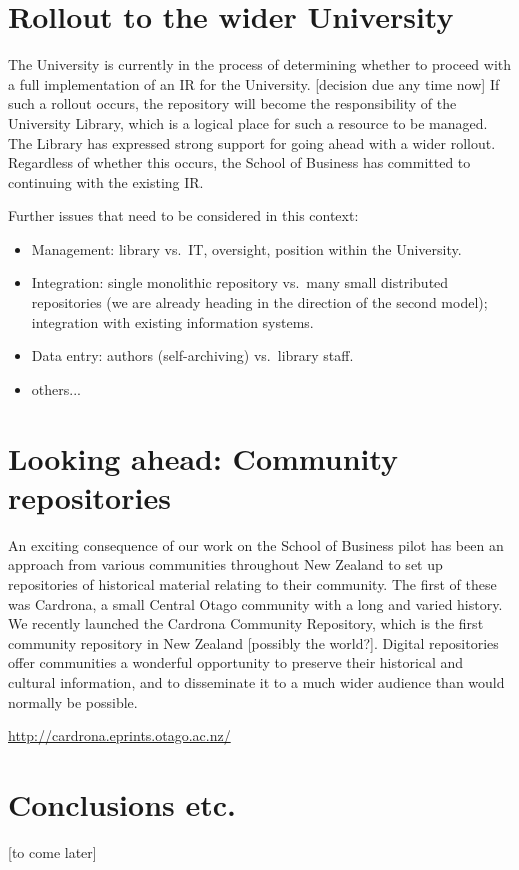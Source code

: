 \documentclass[12pt,pdftex,a4paper,titlepage]{article}
\begin{document}
\section{Rollout to the wider University}

The University is currently in the process of determining whether to proceed with a full implementation of an IR for the University. [decision due any time now] If such a rollout occurs, the repository will become the responsibility of the University Library, which is a logical place for such a resource to be managed. The Library has expressed strong support for going ahead with a wider rollout. Regardless of whether this occurs, the School of Business has committed to continuing with the existing IR.

Further issues that need to be considered in this context:


\begin{itemize}

	\item Management: library vs.\ IT, oversight, position within the University.

	\item Integration: single monolithic repository vs.\ many small distributed repositories (we are already heading in the direction of the second model); integration with existing information systems.

	\item Data entry: authors (self-archiving) vs.\ library staff.

	\item others...

\end{itemize}


\section{Looking ahead: Community repositories}

An exciting consequence of our work on the School of Business pilot has been an approach from various communities throughout New Zealand to set up repositories of historical material relating to their community. The first of these was Cardrona, a small Central Otago community with a long and varied history. We recently launched the Cardrona Community Repository, which is the first community repository in New Zealand [possibly the world?]. Digital repositories offer communities a wonderful opportunity to preserve their historical and cultural information, and to disseminate it to a much wider audience than would normally be possible.

\url{http://cardrona.eprints.otago.ac.nz/}

\section{Conclusions etc.}

[to come later]
\end{document}
